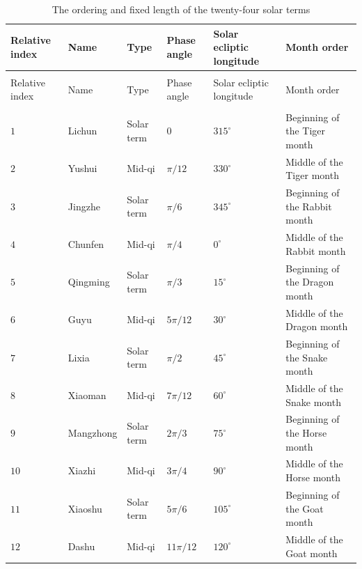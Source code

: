 \begingroup
\small
\setlength{\tabcolsep}{4pt}
\begin{longtable}{>{\centering\arraybackslash}p{1.5cm}>{\centering\arraybackslash}p{2.3cm}>{\centering\arraybackslash}p{1.8cm}>{\centering\arraybackslash}p{1.8cm}>{\centering\arraybackslash}p{2.5cm}>{\centering\arraybackslash}p{3cm}}
    \caption{The ordering and fixed length of the twenty-four solar terms}
    \label{tab:jieqi_sequence}\\
    \toprule
    Relative index & Name & Type & Phase angle & Solar ecliptic longitude & Month order \\
    \midrule
    \endfirsthead
    \multicolumn{6}{c}{\tablename\ \thetable{} (continued)}\\
    \toprule
    Relative index & Name & Type & Phase angle & Solar ecliptic longitude & Month order \\
    \midrule
    \endhead
    \midrule
    \multicolumn{6}{r}{Continued on next page}\\
    \endfoot
    \bottomrule
    \endlastfoot
        \(1\) & Lichun & Solar term & \(0\) & \(315^\circ\) & Beginning of the Tiger month \\
        \(2\) & Yushui & Mid-qi & \(\pi/12\) & \(330^\circ\) & Middle of the Tiger month \\
        \(3\) & Jingzhe & Solar term & \(\pi/6\) & \(345^\circ\) & Beginning of the Rabbit month \\
        \(4\) & Chunfen & Mid-qi & \(\pi/4\) & \(0^\circ\) & Middle of the Rabbit month \\
        \(5\) & Qingming & Solar term & \(\pi/3\) & \(15^\circ\) & Beginning of the Dragon month \\
        \(6\) & Guyu & Mid-qi & \(5\pi/12\) & \(30^\circ\) & Middle of the Dragon month \\
        \(7\) & Lixia & Solar term & \(\pi/2\) & \(45^\circ\) & Beginning of the Snake month \\
        \(8\) & Xiaoman & Mid-qi & \(7\pi/12\) & \(60^\circ\) & Middle of the Snake month \\
        \(9\) & Mangzhong & Solar term & \(2\pi/3\) & \(75^\circ\) & Beginning of the Horse month \\
        \(10\) & Xiazhi & Mid-qi & \(3\pi/4\) & \(90^\circ\) & Middle of the Horse month \\
        \(11\) & Xiaoshu & Solar term & \(5\pi/6\) & \(105^\circ\) & Beginning of the Goat month \\
        \(12\) & Dashu & Mid-qi & \(11\pi/12\) & \(120^\circ\) & Middle of the Goat month \\

\end{longtable}
